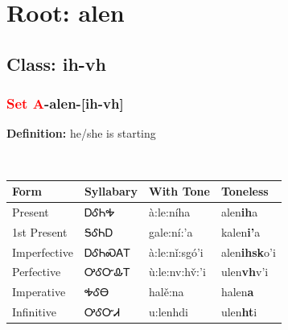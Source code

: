 \needspace{4in}
\section*{Root: alen}
\nopagebreak
{}
\needspace{3in}
\subsection*{Class: ih-vh}
\nopagebreak
\needspace{2in}
\subsubsection*{\textcolor{Red}{Set A}{-}\textbf{alen}{-}[ih-vh]}
\nopagebreak
\textbf{Definition: } he/she is starting
\\[0.5em]
\begin{tabularx}{\textwidth}{l X X X}%
\toprule%
\textbf{Form}&\textbf{Syllabary}&\textbf{With Tone}&\textbf{Toneless}\\%
\midrule%
Present&ᎠᎴᏂᎭ&à:le:níha&alen\textbf{ih}a\\%
1st Present&ᎦᎴᏂᎠ&gale:ní:’a&kalen\textbf{i'}a\\%
Imperfective&ᎠᎴᏂᏍᎪᎢ&à:le:nǐ:sgó’i&alen\textbf{ihsk}o'i\\%
Perfective&ᎤᎴᏅᎲᎢ&ù:le:nv:hv̌:’i&ulen\textbf{vh}v'i\\%
Imperative&ᎭᎴᎾ&halě:na&halen\textbf{a}\\%
Infinitive&ᎤᎴᏅᏗ&u:lenhdi&ulen\textbf{ht}i\\%
\bottomrule%
\end{tabularx}
\\[1em]